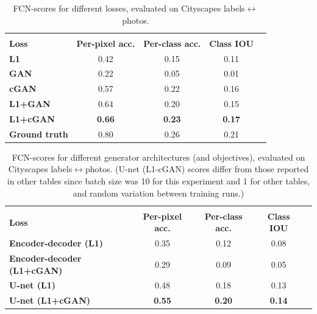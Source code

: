 \documentclass[10pt,twocolumn,letterpaper]{article}
\begin{document}
\begin{table}
\centering
\scalebox{0.75} {
\begin{tabular}{lcccc}
 & & & \\
\textbf{Loss} & \textbf{Per-pixel acc.} & \textbf{Per-class acc.} & \textbf{Class IOU} \\ \hline
\textbf{L1} & 0.42 & 0.15 & 0.11 \\
\textbf{GAN} & 0.22 & 0.05 & 0.01 \\
\textbf{cGAN} & 0.57 & 0.22 & 0.16 \\
\textbf{L1+GAN} & 0.64 & 0.20 & 0.15 \\
\textbf{L1+cGAN} & \textbf{0.66} & \textbf{0.23} & \textbf{0.17} \\ \hline
\textbf{Ground truth} & 0.80 & 0.26 & 0.21 \\
\end{tabular} }
\vspace{-0.1in}
\caption {FCN-scores for different losses, evaluated on Cityscapes labels$\leftrightarrow$photos.}
\label{tab:loss_variations}
\vspace{-0.1in}
\end{table}

\begin{table}
\centering
\scalebox{0.75} {
\begin{tabular}{lcccc}
 & & & \\
\textbf{Loss} & \textbf{Per-pixel acc.} & \textbf{Per-class acc.} & \textbf{Class IOU} \\ \hline
\textbf{Encoder-decoder (L1)} & 0.35 & 0.12 & 0.08 \\
\textbf{Encoder-decoder (L1+cGAN)} & 0.29 & 0.09 & 0.05 \\
\textbf{U-net (L1)} & 0.48 & 0.18 & 0.13 \\
\textbf{U-net (L1+cGAN)} & \textbf{0.55} & \textbf{0.20} & \textbf{0.14} \\
\end{tabular} }
\vspace{-0.1in}
\caption {FCN-scores for different generator architectures (and objectives), evaluated on Cityscapes labels$\leftrightarrow$photos. (U-net (L1-cGAN) scores differ from those reported in other tables since batch size was 10 for this experiment and 1 for other tables, and random variation between training runs.)}
\label{tab:arch_variations}
\vspace{-0.1in}
\end{table}
\end{document}
